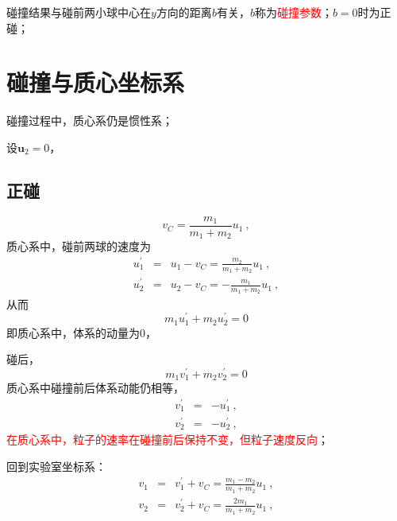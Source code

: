 \documentclass[11pt,a4paper]{article}
\renewcommand{\vec}[1]{\boldsymbol{#1}}
\begin{document}
碰撞结果与碰前两小球中心在$y$方向的距离$b$有关，$b$称为\textcolor{red}{碰撞参数}；$b = 0$时为正碰；

\section{碰撞与质心坐标系}
碰撞过程中，质心系仍是惯性系；

设$\vec{u}_2 = 0$，

\subsection{正碰}
\begin{equation}
v_C = \frac{m_1}{m_1 +m_2} u_1 ~,
\end{equation}
质心系中，碰前两球的速度为
\begin{eqnarray}
\nonumber u_1^{\prime} &=& u_1 -v_C = \frac{m_2}{m_1+m_2} u_1 ~, \\
u_2^{\prime} &=& u_2 -v_C = -\frac{m_1}{m_1 +m_2} u_1 ~, 
\end{eqnarray}
从而
\begin{equation}
m_1 u_1^{\prime} + m_2 u_2^{\prime} = 0
\end{equation}
即质心系中，体系的动量为$0$，

碰后，
\begin{equation}
m_1 v_1^{\prime} + m_2 v_2^{\prime} = 0
\end{equation}
质心系中碰撞前后体系动能仍相等，
\begin{eqnarray}
\nonumber v_1^{\prime} &=& -u_1^{\prime}  ~, \\
v_2^{\prime}  &=& -u_2^{\prime}  ~,
\end{eqnarray}
\textcolor{red}{在质心系中，粒子的速率在碰撞前后保持不变，但粒子速度反向}；

回到实验室坐标系：
\begin{eqnarray}
v_1 &=& v_1^{\prime}  +v_C = \frac{m_1-m_2}{m_1+m_2} u_1 ~, \\
v_2 &=& v_2^{\prime}  +v_C =  \frac{2m_1}{m_1+m_2} u_1 ~, 
\end{eqnarray}
\end{document}
